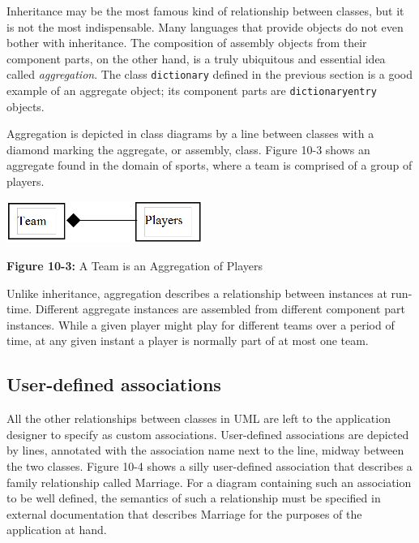 Inheritance may be the most famous kind of relationship between classes,
but it is not the most indispensable. Many languages that provide
objects do not even bother with inheritance. The composition of
assembly objects from their component parts, on the other hand, is a
truly ubiquitous and essential idea called
\textit{aggregation}. The class \texttt{dictionary}
defined in the previous section is a good example of an aggregate
object; its component parts are \texttt{dictionaryentry} objects.

Aggregation is depicted in class diagrams by a line between classes with
a diamond marking the aggregate, or assembly, class. Figure 10-3
shows an aggregate found in the domain of sports, where a team is
comprised of a group of players.

\begin{center}
\includegraphics[width=2.52in,height=0.54in]{ub-img/aggregat.png} 

{\sffamily\bfseries Figure 10-3:}
{\sffamily A Team is an Aggregation of Players}
\end{center}

Unlike inheritance, aggregation describes a relationship between
instances at run-time. Different aggregate instances are assembled from
different component part instances. While a given player might play for
different teams over a period of time, at any given instant a player is
normally part of at most one team.

\subsection{User-defined associations}

All the other relationships between classes in UML are left
to the application designer to specify as custom associations.
User-defined associations are depicted by lines, annotated with the
association name next to the line, midway between the two classes.
Figure 10-4 shows a silly user-defined association that describes a
family relationship called Marriage. For a diagram containing such an
association to be well defined, the semantics of such a relationship
must be specified in external documentation that describes Marriage for
the purposes of the application at hand.

